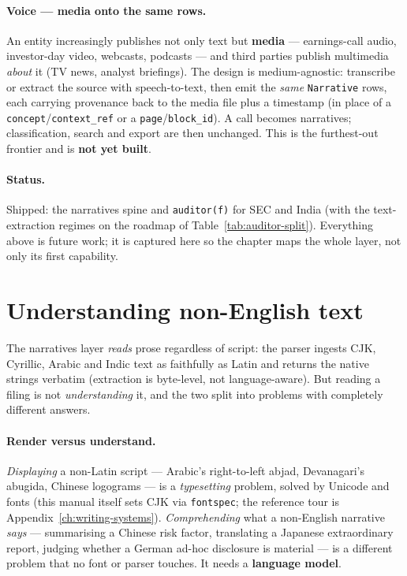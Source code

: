 \documentclass[11pt,a4paper]{report}
\begin{document}
\paragraph{Voice --- media onto the same rows.} An entity increasingly publishes not only text but
\textbf{media} --- earnings-call audio, investor-day video, webcasts, podcasts --- and third parties publish
multimedia \emph{about} it (TV news, analyst briefings). The design is medium-agnostic: transcribe or extract
the source with speech-to-text, then emit the \emph{same} \texttt{Narrative} rows, each carrying provenance
back to the media file plus a timestamp (in place of a \texttt{concept}/\texttt{context\_ref} or a
\texttt{page}/\texttt{block\_id}). A call becomes narratives; classification, search and export are then
unchanged. This is the furthest-out frontier and is \textbf{not yet built}.

\paragraph{Status.} Shipped: the narratives spine and \texttt{auditor(f)} for SEC and India (with the
text-extraction regimes on the roadmap of Table~\ref{tab:auditor-split}). Everything above is future work; it
is captured here so the chapter maps the whole layer, not only its first capability.

\section{Understanding non-English text}
\label{sec:narratives-multilingual}

The narratives layer \emph{reads} prose regardless of script: the parser ingests CJK, Cyrillic, Arabic and
Indic text as faithfully as Latin and returns the native strings verbatim (extraction is byte-level, not
language-aware). But reading a filing is not \emph{understanding} it, and the two split into problems with
completely different answers.

\paragraph{Render versus understand.} \emph{Displaying} a non-Latin script --- Arabic's right-to-left abjad,
Devanagari's abugida, Chinese logograms --- is a \emph{typesetting} problem, solved by Unicode and fonts (this
manual itself sets CJK via \texttt{fontspec}; the reference tour is Appendix~\ref{ch:writing-systems}).
\emph{Comprehending} what a non-English narrative \emph{says} --- summarising a Chinese risk factor,
translating a Japanese extraordinary report, judging whether a German ad-hoc disclosure is material --- is a
different problem that no font or parser touches. It needs a \textbf{language model}.
\end{document}
